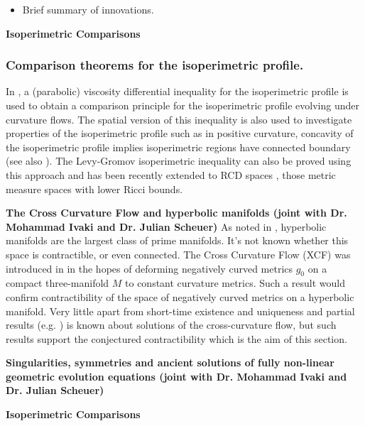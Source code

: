 \documentclass[12pt]{amsart}
\begin{document}
\begin{itemize}
\item Brief summary of innovations.
\end{itemize}

\noindent\textbf{Isoperimetric Comparisons}
\label{sec-3-1}
\subsubsection*{Comparison theorems for the isoperimetric profile.}
\label{sec-3-1-1}



In \cite{Bryan,pbthesis,MR2843240,MR2794630}, a (parabolic) viscosity differential inequality for the isoperimetric profile is used to obtain a comparison principle for the isoperimetric profile evolving under curvature flows. The spatial version of this inequality is also used to investigate properties of the isoperimetric profile such as in positive curvature, concavity of the isoperimetric profile implies isoperimetric regions have connected boundary (see also \cite{MR1674097}). The Levy-Gromov isoperimetric inequality can also be proved using this approach \cite{MR3544942} and has been recently extended to RCD spaces \cite{MR3608721}, those metric measure spaces with lower Ricci bounds.

\noindent\textbf{The Cross Curvature Flow and hyperbolic manifolds (joint with Dr. Mohammad Ivaki and Dr. Julian Scheuer)}
\label{sec-3-2}
As noted in \cite{MR2602839}, hyperbolic manifolds are the largest class of prime manifolds. It's not known whether this space is contractible, or even connected. The Cross Curvature Flow (XCF) was introduced in \cite{MR2055396} in the hopes of deforming negatively curved metrics $g_0$ on a compact three-manifold $M$ to constant curvature metrics. Such a result would confirm contractibility of the space of negatively curved metrics on a hyperbolic manifold. Very little apart from short-time existence and uniqueness \cite{MR2207496} and partial results (e.g. \cite{MR2448593,MR2407107}) is known about solutions of the cross-curvature flow, but such results support the conjectured contractibility which is the aim of this section.

\noindent\textbf{Singularities, symmetries and ancient solutions of fully non-linear geometric evolution equations (joint with Dr. Mohammad Ivaki and Dr. Julian Scheuer)}
\label{sec-3-3}


\noindent\textbf{Isoperimetric Comparisons}
\label{sec-3-4}
\end{document}
